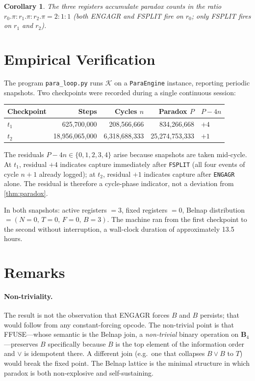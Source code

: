 \documentclass[12pt,a4paper]{article}
\newtheorem{corollary}[theorem]{Corollary}
\theoremstyle{definition}
\theoremstyle{remark}
\begin{document}
\begin{corollary}
The three registers accumulate paradox counts in the ratio
$r_0.\pi : r_1.\pi : r_2.\pi = 2 : 1 : 1$ (both ENGAGR and FSPLIT fire on
$r_0$; only FSPLIT fires on $r_1$ and $r_2$).
\end{corollary}

\section{Empirical Verification}

The program \texttt{para\_loop.py} runs $\mathcal{K}$ on a \texttt{ParaEngine}
instance, reporting periodic snapshots.  Two checkpoints were recorded during
a single continuous session:

\begin{center}
\begin{tabular}{lrrrl}
\toprule
Checkpoint & Steps & Cycles $n$ & Paradox $P$ & $P - 4n$ \\
\midrule
$t_1$ & 625,700,000 & 208,566,666 & 834,266,668 & $+4$ \\
$t_2$ & 18,956,065,000 & 6,318,688,333 & 25,274,753,333 & $+1$ \\
\bottomrule
\end{tabular}
\end{center}

The residuals $P - 4n \in \{0, 1, 2, 3, 4\}$ arise because snapshots are
taken mid-cycle.  At $t_1$, residual $+4$ indicates capture immediately
after \texttt{FSPLIT} (all four events of cycle $n+1$ already logged); at
$t_2$, residual $+1$ indicates capture after \texttt{ENGAGR} alone.  The
residual is therefore a cycle-phase indicator, not a deviation from
\cref{thm:paradox}.

In both snapshots: active registers $= 3$, fixed registers $= 0$, Belnap
distribution $= (N{=}0,\, T{=}0,\, F{=}0,\, B{=}3)$.  The machine ran from
the first checkpoint to the second without interruption, a wall-clock
duration of approximately 13.5 hours.

\section{Remarks}

\paragraph{Non-triviality.}
The result is not the observation that ENGAGR forces $B$ and $B$ persists;
that would follow from any constant-forcing opcode.  The non-trivial point is
that FFUSE---whose semantic is the Belnap join, a \emph{non-trivial} binary
operation on $\mathbf{B}_4$---preserves $B$ specifically because $B$ is the
top element of the information order and $\vee$ is idempotent there.  A
different join (e.g.\ one that collapses $B \vee B$ to $T$) would break the
fixed point.  The Belnap lattice is the minimal structure in which paradox is
both non-explosive and self-sustaining.
\end{document}
